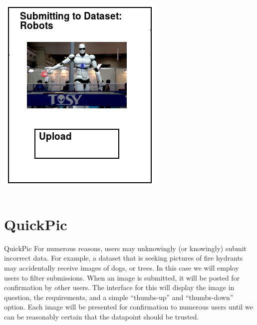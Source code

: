 \documentclass[aspectratio=169]{beamer}
\begin{document}
\begin{frame}
\begin{columns}[c]
\begin{column}{0.5\columnwidth}
      \includegraphics[width=\columnwidth]{ss_photohunter_upload}
    \end{column}
  \end{columns}
\end{frame}

\section{QuickPic}

\begin{frame}{QuickPic}
  For numerous reasons, users may unknowingly (or knowingly) submit
  incorrect data. For example, a dataset that is seeking pictures of
  fire hydrants may accidentally receive images of dogs, or trees. In
  this case we will employ users to filter submissions. When an image
  is
  submitted, it will be posted for confirmation by other users. The
  interface for this will display the image in question, the
  requirements, and a simple ``thumbs-up'' and ``thumbs-down'' option.
  Each image will be presented for confirmation to numerous users
  until
  we can be reasonably certain that the datapoint should be trusted.
\end{frame}
\end{document}
